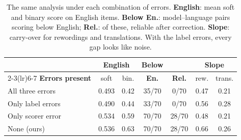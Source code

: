 \begin{table}[t]
\centering
\small
\setlength{\tabcolsep}{2.6pt}
\begin{tabular}{lcccccc}
\toprule
 & \multicolumn{2}{c}{\textbf{English}} & \textbf{Below} & & \multicolumn{2}{c}{\textbf{Slope}} \\
\cmidrule(lr){2-3}\cmidrule(lr){6-7}
\textbf{Errors present} & soft & bin. & \textbf{En.} & \textbf{Rel.} & rew. & trans. \\
\midrule
All three errors & 0.493 & 0.42 & 35/70 & 0/70 & 0.47 & 0.21 \\
Only label errors & 0.490 & 0.44 & 33/70 & 0/70 & 0.56 & 0.28 \\
Only scorer error & 0.534 & 0.59 & 70/70 & 28/70 & 0.48 & 0.21 \\
None (ours) & 0.536 & 0.63 & 70/70 & 28/70 & 0.66 & 0.26 \\
\bottomrule
\end{tabular}
\caption{The same analysis under each combination of errors. \textbf{English}: mean soft and binary score on English items. \textbf{Below En.}: model--language pairs scoring below English; \textbf{Rel.}: of these, reliable after correction. \textbf{Slope}: carry-over for rewordings and translations. With the label errors, every gap looks like noise.}
\label{tab:pipeline}
\end{table}
